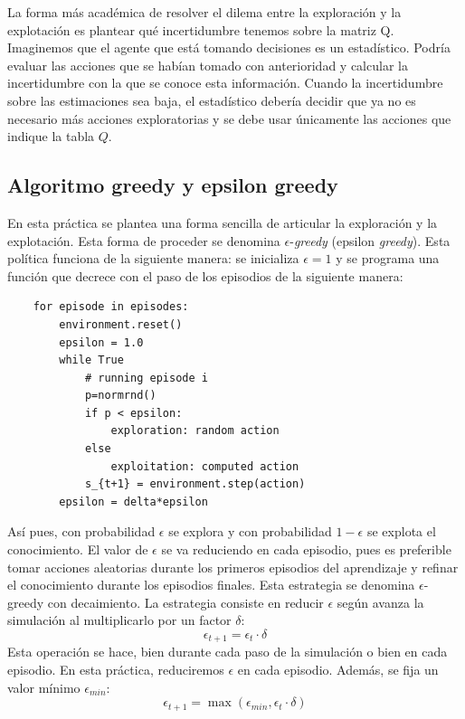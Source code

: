 \documentclass{article}
\begin{document}
La forma más académica de resolver el dilema entre la exploración y la explotación es plantear qué incertidumbre tenemos sobre la matriz Q. Imaginemos que el agente que está tomando decisiones es un estadístico. Podría evaluar las acciones que se habían tomado con anterioridad y calcular la incertidumbre con la que se conoce esta información. Cuando la incertidumbre sobre las estimaciones sea  baja, el estadístico debería decidir que ya no es necesario más acciones exploratorias y se debe usar únicamente las acciones que indique la tabla $Q$.

\subsection{Algoritmo greedy y epsilon greedy}
En esta práctica se plantea una forma sencilla de articular la exploración y la explotación. Esta forma de proceder se denomina $\epsilon$-\textit{greedy} (epsilon \textit{greedy}). Esta política funciona de la siguiente manera: se inicializa $\epsilon=1$ y se programa una función que decrece con el paso de los episodios de la siguiente manera:
\begin{verbatim}
    for episode in episodes:
        environment.reset()
        epsilon = 1.0
        while True
            # running episode i
            p=normrnd()
            if p < epsilon:
                exploration: random action
            else
                exploitation: computed action
            s_{t+1} = environment.step(action)
        epsilon = delta*epsilon
\end{verbatim}

Así pues, con probabilidad $\epsilon$ se explora y con probabilidad $1-\epsilon$ se explota el conocimiento. El valor de $\epsilon$ se va reduciendo en cada episodio, pues es preferible tomar acciones aleatorias durante los primeros episodios del aprendizaje y refinar el conocimiento durante los episodios finales. Esta estrategia se denomina $\epsilon$-greedy con decaimiento. La estrategia consiste en reducir $\epsilon$ según avanza la simulación al multiplicarlo por un factor $\delta$:
\begin{equation}
    \epsilon_{t+1}= \epsilon_{t}\cdot\delta
\end{equation}
Esta operación se hace, bien durante cada paso de la simulación o bien en cada episodio. En esta práctica, reduciremos $\epsilon$ en cada episodio. Además, se fija un valor mínimo $\epsilon_{min}$:
\begin{equation}
    \epsilon_{t+1}= \max(\epsilon_{min}, \epsilon_{t}\cdot\delta)
\end{equation}
\end{document}
